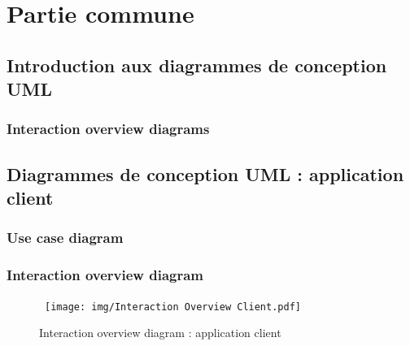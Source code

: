 \documentclass[]{report}
\begin{document}




\newpage

\tableofcontents

\newpage

\chapter{Partie commune}


\newpage




\section{Introduction aux diagrammes de conception UML}



\subsection{Interaction overview diagrams}






\section{Diagrammes de conception UML : application client}



\subsection{Use case diagram}

\newpage

\subsection{Interaction overview diagram}



\begin{figure}[h!]
\hbox{
	\centering\texttt{[image: img/Interaction Overview Client.pdf]}
}
\caption{Interaction overview diagram : application client}
\end{figure}
\end{document}
